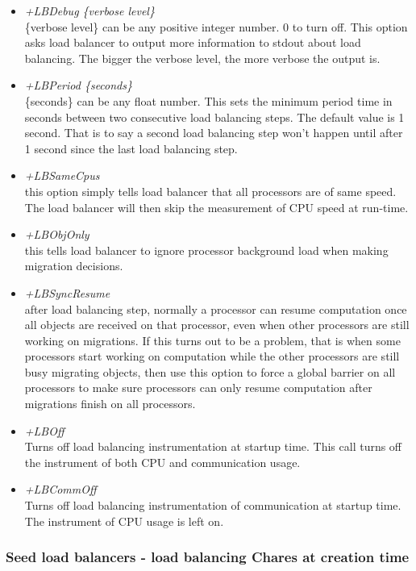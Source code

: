 \begin{enumerate}
\begin{itemize}
\item {\em +LBDebug \{verbose level\}} \\
     \{verbose level\} can be any positive integer number. 0 to turn off. 
     This option asks load balancer to output more information to stdout 
about load balancing. The bigger the verbose level, the more verbose the output is.
\item {\em +LBPeriod \{seconds\}} \\
     \{seconds\} can be any float number. This sets the minimum period time in 
seconds between two consecutive load balancing steps. The default value is 
1 second. That is to say a second load balancing step won't happen until
after 1 second since the last load balancing step.
\item {\em +LBSameCpus} \\
     this option simply tells load balancer that all processors are of same speed. The load balancer will then skip the measurement of CPU speed at run-time.
\item {\em +LBObjOnly} \\
     this tells load balancer to ignore processor background load when making migration decisions.
\item {\em +LBSyncResume} \\
     after load balancing step, normally a processor can resume computation 
once all objects are received on that processor, even when other processors
are still working on migrations.  If this turns out to be a problem, 
that is when some processors start working on computation while the other 
processors are still busy migrating objects, then use this option to force 
a global barrier on all processors to make sure processors can only resume 
computation after migrations finish on all processors.
\item {\em +LBOff} \\
     Turns off load balancing instrumentation at startup time. This call turns
off the instrument of both CPU and communication usage.
\item {\em +LBCommOff} \\
     Turns off load balancing instrumentation of communication at startup time. 
The instrument of CPU usage is left on.
\end{itemize}

\end{enumerate}

\subsubsection{Seed load balancers - load balancing Chares at creation time}

